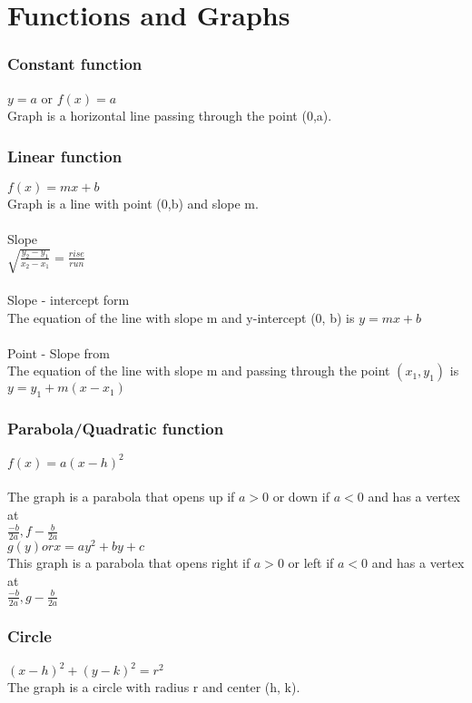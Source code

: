 \documentclass[10pt,onecolumn]{article}
\begin{document}
{\pagebreak

\part{Functions and Graphs}

\section{Constant function}
\(y = a\) or \(f(x) = a \) \\ 
Graph is a horizontal line passing through the point (0,a).

\section{Linear function}
\(f(x) = mx + b \) \\
Graph is a line with point (0,b) and slope m. \\\\
Slope \\
\(\sqrt{\frac{y_2 - y_1}{x_2 - x_1}} = \frac{rise}{run}\) \\\\
Slope - intercept form \\
The equation of the line with slope m and y-intercept (0, b) is 
\(y = mx + b \) \\\\
Point - Slope from \\
The equation of the line with slope m and passing through the point \((x_1, y_1)\) is \\
\(y = y_1 + m(x - x_1) \)

\section{Parabola/Quadratic function}
\(f(x) = a(x - h)^2 \) \\\\
The graph is a parabola that opens up if \(a > 0\) or down if \(a < 0\) and has a vertex at \\
\(\frac{-b}{2a}, f - \frac{b}{2a} \) \\
\(g(y) or x = ay^2 + by + c \) \\
This graph is a parabola that opens right if \(a > 0\) or left  if \(a < 0\) and has a vertex at \\
\(\frac{-b}{2a}, g - \frac{b}{2a} \)

\section{Circle}
\((x - h)^2 + (y - k)^2 = r^2  \) \\
The graph is a circle with radius r and center (h, k).

}
\end{document}
